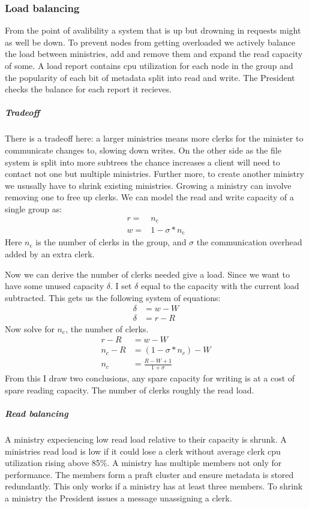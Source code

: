 \subsubsection*{Load balancing} \label{sec:loadb}
From the point of avalibility a system that is up but drowning in requests might as well be down. To prevent nodes from getting overloaded we actively balance the load between ministries, add and remove them and expand the read capacity of some. A load report contains cpu utilization for each node in the group and the popularity of each bit of metadata split into read and write. The President checks the balance for each report it recieves.
%
\subparagraph*{Tradeoff}
There is a tradeoff here: a larger ministries means more clerks for the minister to communicate changes to, slowing down writes. On the other side as the file system is split into more subtrees the chance increases a client will need to contact not one but multiple ministries. Further more, to create another ministry we ususally have to shrink existing ministries. Growing a ministry can involve removing one to free up clerks. 
%
We can model the read and write capacity of a single group as:
\begin{align}
	r =& n_\text{c} \\
	w =& 1 - \sigma*n_\text{c}
\end{align}%
Here $n_\text{c}$ is the number of clerks in the group, and $\sigma$ the communication overhead added by an extra clerk. 

Now we can derive the number of clerks needed give a load. Since we want to have some unused capacity $\delta$. I set $\delta$ equal to the capacity with the current load subtracted. This gets us the following system of equations: 
\begin{align}
	\delta &= w - W \\
	\delta &= r - R
\end{align}%
Now solve for $n_\text{c}$, the number of clerks.
\begin{align}
	r - R &= w - W \\
	n_c - R &= \left(1 - \sigma*n_c\right) - W \\
	n_c &= \frac{R - W + 1}{1 + \sigma}
\end{align}
From this I draw two conclusions, any spare capacity for writing is at a cost of spare reading capacity. The number of clerks roughly the read load.
%
%
\subparagraph*{Read balancing}
A ministry expeciencing low read load relative to their capacity is shrunk. A ministries read load is low if it could lose a clerk without average clerk cpu utilization rising above 85\%. A ministry has multiple members not only for performance. The members form a \ac{praft} cluster and ensure metadata is stored redundantly. This only works if a ministry has at least three members. To shrink a ministry the President issues a \raft{} message unassigning a clerk. 

